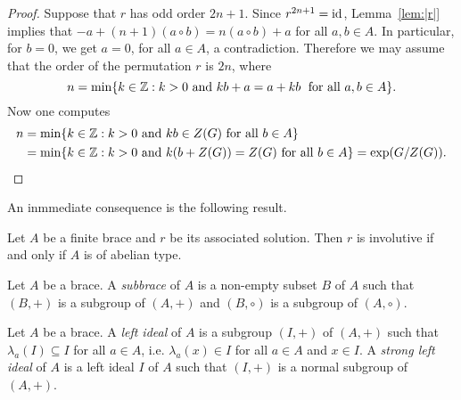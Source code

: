 \begin{proof} 
  Suppose that $r$ has odd order $2n+1$. Since $r^{2n+1}=\operatorname{id}$, 
  Lemma~\ref{lem:|r|} implies that $-a+(n+1)(a\circ b)=n(a\circ b)+a$
  for all $a,b\in A$. In particular, for $b=0$, we get $a=0$, 
  for all $a\in A$, a contradiction. 
  Therefore we may assume that the order of the permutation $r$ is
  $2n$, where 
  \[
  n=\min\{k\in\mathbb{Z}: k>0\text{ and }kb+a=a+kb\;\text{ for all }a,b\in A\}.
  \]
  Now one computes
  \begin{align*} 
  n&=\min\{k\in\mathbb{Z}: k>0\text{ and }kb\in Z(G)\text{ for all }b\in A\}\\ 
  &=\min\{k\in\mathbb{Z}: k>0\text{ and }k(b+Z(G)) = Z(G)\text{ for all }b\in A\} =\exp(G/Z(G)).\qedhere
  \end{align*}
\end{proof}

An inmmediate consequence is the following result.

\begin{corollary}
    Let $A$ be a finite brace and $r$ be its associated solution. Then 
    $r$ is involutive if and only if $A$ is of abelian type.
    \end{corollary}





\begin{definition}
Let $A$ be a brace. A \emph{subbrace} of $A$ is a non-empty 
subset $B$ of $A$ such that $(B,+)$ is a subgroup of $(A,+)$ and $(B,\circ)$ is a subgroup of $(A,\circ)$. 
\end{definition}

\begin{definition}
    Let $A$ be a brace. A \emph{left ideal} of $A$ is a subgroup $(I,+)$ of
	$(A,+)$ such that $\lambda_a(I)\subseteq I$ for all $a\in A$, i.e. $\lambda_a(x)\in I$ for all $a\in A$ and $x\in I$. A \emph{strong left ideal} of $A$ 
	is a left ideal $I$ of $A$ such that $(I,+)$ is a normal subgroup of $(A,+)$. 
\end{definition}

